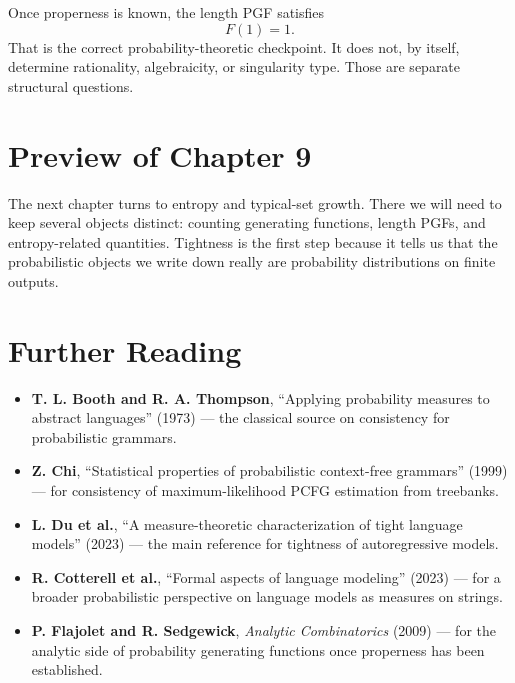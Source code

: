 Once properness is known, the length PGF satisfies
\[
  F(1)=1.
\]
That is the correct probability-theoretic checkpoint. It does not, by itself, determine rationality, algebraicity, or singularity type. Those are separate structural questions.

\section*{Preview of Chapter 9}

The next chapter turns to entropy and typical-set growth. There we will need to keep several objects distinct: counting generating functions, length PGFs, and entropy-related quantities. Tightness is the first step because it tells us that the probabilistic objects we write down really are probability distributions on finite outputs.

\section*{Further Reading}

\begin{itemize}
  \item \textbf{T. L. Booth and R. A. Thompson}, ``Applying probability measures to abstract languages'' (1973) \cite{BoothThompson1973} --- the classical source on consistency for probabilistic grammars.
  \item \textbf{Z. Chi}, ``Statistical properties of probabilistic context-free grammars'' (1999) \cite{Chi1999} --- for consistency of maximum-likelihood PCFG estimation from treebanks.
  \item \textbf{L. Du et al.}, ``A measure-theoretic characterization of tight language models'' (2023) \cite{DuEtAl2023} --- the main reference for tightness of autoregressive models.
  \item \textbf{R. Cotterell et al.}, ``Formal aspects of language modeling'' (2023) \cite{CotterellEtAl2023} --- for a broader probabilistic perspective on language models as measures on strings.
  \item \textbf{P. Flajolet and R. Sedgewick}, \emph{Analytic Combinatorics} (2009) \cite{FlajoletSedgewick2009} --- for the analytic side of probability generating functions once properness has been established.
\end{itemize}
